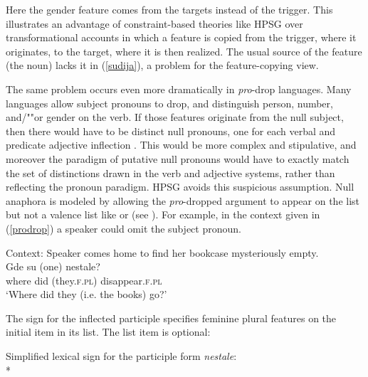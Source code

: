 \documentclass[output=paper
 	        ,biblatex
                ,babelshorthands
                ,newtxmath
                ,draftmode
                ,colorlinks, citecolor=brown
]{langscibook}
\begin{document}
\noindent 
Here the gender feature comes from the targets instead of the trigger.   This illustrates an advantage of constraint-based theories like HPSG over transformational accounts in which a feature is copied from the trigger, where it originates, to the target, where it is then realized.  The usual source of the feature (the noun) lacks it in (\ref{sudija}), a problem for the feature-copying view.   

The same problem occurs even more dramatically in \emph{pro}-drop languages.  Many languages
allow subject pronouns to drop, and distinguish person, number, and/""or gender on the verb.  If those
features originate from the null subject, then there would have to be distinct null pronouns, one
for each verbal and predicate adjective inflection \citep[64]{Pollard+Sag:1994}.  This would be more
complex and stipulative, and moreover the paradigm of putative null pronouns would have to exactly
match the set of distinctions drawn in the verb and adjective systems, rather than reflecting the
pronoun paradigm.    HPSG avoids this suspicious assumption.  Null anaphora is modeled by allowing
the \textit{pro}-dropped argument to appear on the \argst list but not a valence list like \subj or \comps (see ).  For example, in the context given in (\ref{prodrop}) a  speaker could omit the subject pronoun.  

\begin{exe}
\ex 
\label{prodrop}
Context: Speaker comes home to find her bookcase mysteriously empty. \\
\gll  Gde su (one) nestale? \\
where did (they.\textsc{f.pl}) disappear.\textsc{f.pl}     \\
\glt `Where did they (i.e. the books) go?' 
\end{exe}


\noindent
The sign for the inflected participle specifies feminine plural features on the initial item in its \argst list.  The \subj list item is optional: 

\begin{exe} 
\ex		\label{nestale} 
Simplified lexical sign for the participle form \textit{nestale}:\\*
\end{exe}
\end{document}
